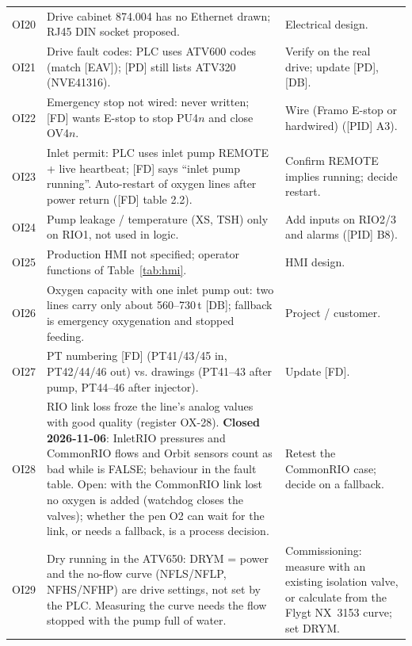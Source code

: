 \documentclass[11pt,a4paper]{article}
\begin{document}
\begin{small}
\begin{longtable}{@{}P{9mm}P{98mm}P{48mm}@{}}
OI20 & Drive cabinet 874.004 has no Ethernet drawn; RJ45 DIN socket proposed. & Electrical design. \\
OI21 & Drive fault codes: PLC uses ATV600 codes (match [EAV]); [PD] still lists ATV320 (NVE41316). & Verify on the real drive; update [PD], [DB]. \\
OI22 & Emergency stop not wired:  never written; [FD] wants E-stop to stop PU4$n$ and close OV4$n$. & Wire (Framo E-stop or hardwired) ([PID] A3). \\
OI23 & Inlet permit: PLC uses inlet pump REMOTE + live heartbeat; [FD] says ``inlet pump running''. Auto-restart of oxygen lines after power return ([FD] table 2.2). & Confirm REMOTE implies running; decide restart. \\
OI24 & Pump leakage / temperature (XS, TSH) only on RIO1, not used in logic. & Add inputs on RIO2/3 and alarms ([PID] B8). \\
OI25 & Production HMI not specified; operator functions of Table~\ref{tab:hmi}. & HMI design. \\
OI26 & Oxygen capacity with one inlet pump out: two lines carry only about 560--730\,t [DB]; fallback is emergency oxygenation and stopped feeding. & Project / customer. \\
OI27 & PT numbering [FD] (PT41/43/45 in, PT42/44/46 out) vs. drawings (PT41--43 after pump, PT44--46 after injector). & Update [FD]. \\
OI28 & RIO link loss froze the line's analog values with good quality (register OX-28). \textbf{Closed 2026-11-06}: InletRIO pressures and CommonRIO flows and Orbit sensors count as bad while  is FALSE; behaviour in the fault table. Open: with the CommonRIO link lost no oxygen is added (watchdog closes the valves); whether the pen O2 can wait for the link, or needs a fallback, is a process decision. & Retest the CommonRIO case; decide on a fallback. \\
OI29 & Dry running in the ATV650: DRYM = power and the no-flow curve (NFLS/NFLP, NFHS/NFHP) are drive settings, not set by the PLC. Measuring the curve needs the flow stopped with the pump full of water. & Commissioning: measure with an existing isolation valve, or calculate from the Flygt NX~3153 curve; set DRYM. \\
\end{longtable}
\end{small}
\end{document}
